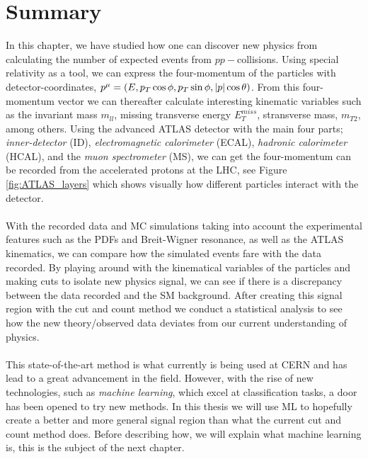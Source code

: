 \documentclass[12pt, a4paper]{book}
\begin{document}
\section{Summary}
In this chapter, we have studied how one can discover new physics from calculating the number of expected events from $pp-$collisions. Using special relativity as a tool, we can express the four-momentum of the particles with 
detector-coordinates, $p^\mu=(E,p_T\cos\phi,p_T\sin\phi,\abs{p}\cos\theta)$. From this four-momentum vector we can thereafter calculate interesting kinematic variables such as the invariant mass $m_{ll}$, missing transverse energy $E_T^{miss}$, 
stransverse mass, $m_{T2}$, among others. Using the advanced ATLAS detector with the main four parts; \textit{inner-detector} (ID), \textit{electromagnetic calorimeter} (ECAL), \textit{hadronic calorimeter} (HCAL), and the \textit{muon spectrometer} (MS), 
we can get the four-momentum can be recorded from the accelerated protons at the LHC, see Figure \ref{fig:ATLAS_layers} which shows visually how different particles interact with the detector.\\
\\With the recorded data and MC simulations taking into account the experimental features such as the PDFs and Breit-Wigner resonance, as well as the ATLAS kinematics, we can compare how the simulated events fare with the data recorded. 
By playing around with the kinematical variables of the particles and making cuts to isolate new physics signal, we can see if there is a discrepancy between the data recorded and the SM background. After creating this signal region with the cut and count 
method we conduct a statistical analysis to see how the new theory/observed data deviates from our current understanding of physics.\\
\\This state-of-the-art method is what currently is being used at CERN and has lead to a great advancement in the field. However, with the rise of new technologies, such as \textit{machine learning}, which excel at classification tasks, a door has been 
opened to try new methods. In this thesis we will use ML to hopefully create a better and more general signal region than what the current cut and count method does. Before describing how, we will explain what machine learning is, this is the subject 
of the next chapter.
\end{document}
